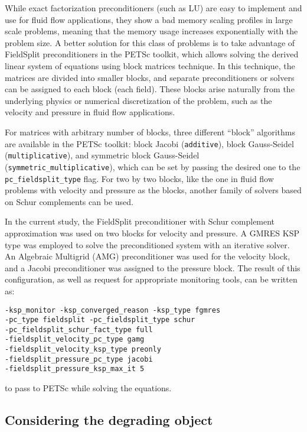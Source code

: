 While exact factorization preconditioners (such as LU) are easy to implement and use for fluid flow applications, they show a bad memory scaling profiles in large scale problems, meaning that the memory usage increases exponentially with the problem size. A better solution for this class of problems is to take advantage of FieldSplit preconditioners in the PETSc toolkit, which allows solving the derived linear system of equations using block matrices technique. In this technique, the matrices are divided into smaller blocks, and separate preconditioners or solvers can be assigned to each block (each field). These blocks arise naturally from the underlying physics or numerical discretization of the problem, such as the velocity and pressure in fluid flow applications. 

For matrices with arbitrary number of blocks, three different ``block'' algorithms are available in the PETSc toolkit: block Jacobi (\verb|additive|), block Gauss-Seidel (\verb|multiplicative|), and symmetric block Gauss-Seidel \\ (\verb|symmetric_multiplicative|), which can be set by passing the desired one to the \verb|pc_fieldsplit_type| flag. For two by two blocks, like the one in fluid flow problems with velocity and pressure as the blocks, another family of solvers based on Schur complements can be used. 

In the current study, the FieldSplit preconditioner with Schur complement approximation was used on two blocks for velocity and pressure. A GMRES KSP type \cite{Saad1986} was employed to solve the preconditioned system with an iterative solver. An Algebraic Multigrid (AMG) preconditioner \cite{mccormick1987} was used for the velocity block, and a Jacobi preconditioner was assigned to the pressure block. The result of this configuration, as well as request for appropriate monitoring tools, can be written as:
\begin{verbatim}
-ksp_monitor -ksp_converged_reason -ksp_type fgmres 
-pc_type fieldsplit -pc_fieldsplit_type schur 
-pc_fieldsplit_schur_fact_type full
-fieldsplit_velocity_pc_type gamg 
-fieldsplit_velocity_ksp_type preonly 
-fieldsplit_pressure_pc_type jacobi 
-fieldsplit_pressure_ksp_max_it 5 \end{verbatim}
to pass to PETSc while solving the equations.


\subsection{Considering the degrading object}

